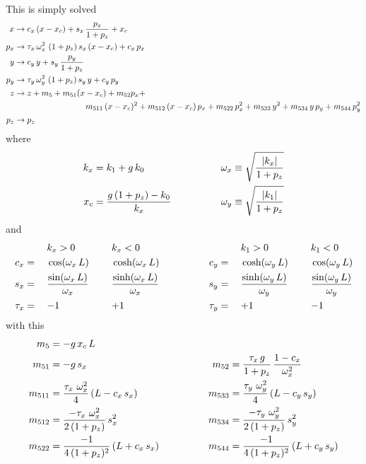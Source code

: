 \documentclass{book}
\begin{document}
This is simply solved
\begin{align}
  x   &\rightarrow c_x \, (x - x_c) + s_x \, \frac{p_x}{1 + p_z} + x_c \CRNO
  p_x &\rightarrow \tau_x \, \om_x^2 \, \, (1 + p_z) \, s_x \, (x -x_c) + c_x \, p_x \CRNO
  y   &\rightarrow c_y \, y + s_y \, \frac{p_y}{1 + p_z} \CRNO
  p_y &\rightarrow \tau_y \, \om_y^2 \, \, (1 + p_z) \, s_y \, y + c_y \, p_y \CRNO
  z   &\rightarrow z + m_5 + m_{51} (x - x_c) + m_{52} p_x + \CRNO
      &\hspace*{20ex} m_{511} \, (x-x_c)^2 + m_{512} \, (x-x_c) \, p_x + m_{522} \, p_x^2 + 
                   m_{533} \, y^2 + m_{534} \, y \, p_y + m_{544} \, p_y^2 \CRNO
  p_z &\rightarrow p_z \nonumber
\end{align}
where 
\begin{alignat}{2}
  k_x &= k_1 + g \, k_0 & \qquad \qquad
  \omega_x &\equiv \sqrt{\frac{|k_x|}{1 + p_z}} \nonumber \\
  x_c &= \frac{g \, (1 + p_z) - k_0}{k_x} & \qquad \qquad
  \omega_y &\equiv \sqrt{\frac{|k_1|}{1 + p_z}} \nonumber \\
\end{alignat}
and
\begin{alignat}{6}
         &\hspace*{3ex}  && k_x > 0          &\hspace*{3ex}& k_x < 0 & \qquad \qquad
         &\hspace*{3ex}  && k_1 > 0          &\hspace*{3ex}& k_1 < 0 \nonumber \\
     c_x &=   && \cos  (\omega_x \, L)               && \cosh (\omega_x \, L) & \qquad \qquad
     c_y &=   && \cosh (\omega_y \, L)               && \cos  (\omega_y \, L) \\
     s_x &=   && \frac{\sin  (\omega_x \, L)}{\omega_x} && \frac{\sinh (\omega_x \, L)}{\omega_x} & \qquad \qquad
     s_y &=   && \frac{\sinh (\omega_y \, L)}{\omega_y} && \frac{\sin  (\omega_y \, L)}{\omega_y} \nonumber \\
  \tau_x &=   && {-}1             && {+}1             & \qquad \qquad
  \tau_y &=   && {+}1             && {-}1             \nonumber
\end{alignat}
with this
\begin{alignat}{2}
  m_5     &= -g \, x_c \, L & \qquad \qquad & \nonumber \\
  m_{51}  &= -g \, s_x & \qquad \qquad
  m_{52}  &= \frac{\tau_x \, g}{1 + p_z} \, \frac{1 - c_x}{\omega_x^2} \nonumber \\
  m_{511} &= \frac{\tau_x \,\, \omega_x^2}{4} \, (L - c_x \, s_x) & \qquad \qquad
  m_{533} &= \frac{\tau_y \,\, \omega_y^2}{4} \, (L - c_y \, s_y) \nonumber \\
  m_{512} &= \frac{-\tau_x \,\, \omega_x^2}{2 \, (1 + p_z)} \, s_x^2 & \qquad \qquad
  m_{534} &= \frac{-\tau_y \,\, \omega_y^2}{2 \, (1 + p_z)} \, s_y^2 \nonumber \\
  m_{522} &= \frac{-1}{4 \, (1 + p_z)^2} \, (L + c_x \, s_x) & \qquad \qquad
  m_{544} &= \frac{-1}{4 \, (1 + p_z)^2} \, (L + c_y \, s_y) \nonumber
\end{alignat}
\end{document}
